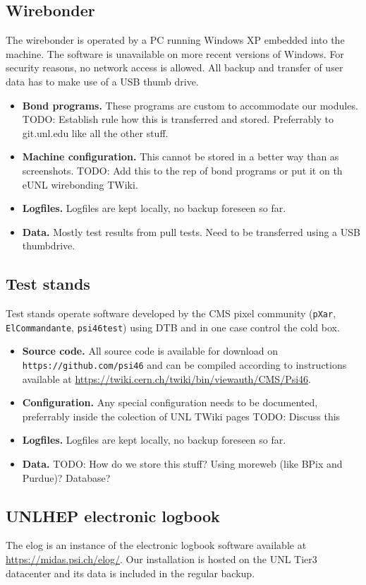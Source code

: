 \documentclass[12pt]{unlsilabsop}
\begin{document}
\subsection{Wirebonder}
The wirebonder is operated by a PC running Windows XP embedded into the machine. The software is unavailable on more recent versions of Windows. For security reasons, no network access is allowed. All backup and transfer of user data has to make use of a USB thumb drive.
\begin{itemize}
    \item \textbf{Bond programs.} These programs are custom to accommodate our modules. TODO: Establish rule how this is transferred and stored. Preferrably to git.unl.edu like all the other stuff.
    \item \textbf{Machine configuration.} This cannot be stored in a better way than as screenshots. TODO: Add this to the rep of bond programs or put it on th eUNL wirebonding TWiki.
    \item \textbf{Logfiles.} Logfiles are kept locally, no backup foreseen so far.
    \item \textbf{Data.} Mostly test results from pull tests. Need to be transferred using a USB thumbdrive.
\end{itemize}

\subsection{Test stands}
Test stands operate software developed by the CMS pixel community (\texttt{pXar}, \texttt{ElCommandante}, \texttt{psi46test}) using DTB and in one case control the cold box.
\begin{itemize}
    \item \textbf{Source code.} All source code is available for download on \texttt{https://github.com/psi46} and can be compiled according to instructions available at \url{https://twiki.cern.ch/twiki/bin/viewauth/CMS/Psi46}.
    \item \textbf{Configuration.} Any special configuration needs to be documented, preferrably inside the colection of UNL TWiki pages TODO: Discuss this
    \item \textbf{Logfiles.} Logfiles are kept locally, no backup foreseen so far.
    \item \textbf{Data.} TODO: How do we store this stuff? Using moreweb (like BPix and Purdue)? Database?
\end{itemize}

\subsection{UNLHEP electronic logbook}
The elog is an instance of the electronic logbook software available at \url{https://midas.psi.ch/elog/}. Our installation is hosted on the UNL Tier3 datacenter and its data is included in the regular backup.
\end{document}
